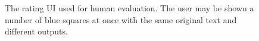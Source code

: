 \begin{figure}[!htb]
  \centering
  \caption{The rating UI used for human evaluation. The user may be shown a number of blue squares at once with the same original text and different outputs.}
  \label{fig:rater_ui}
\end{figure} 

